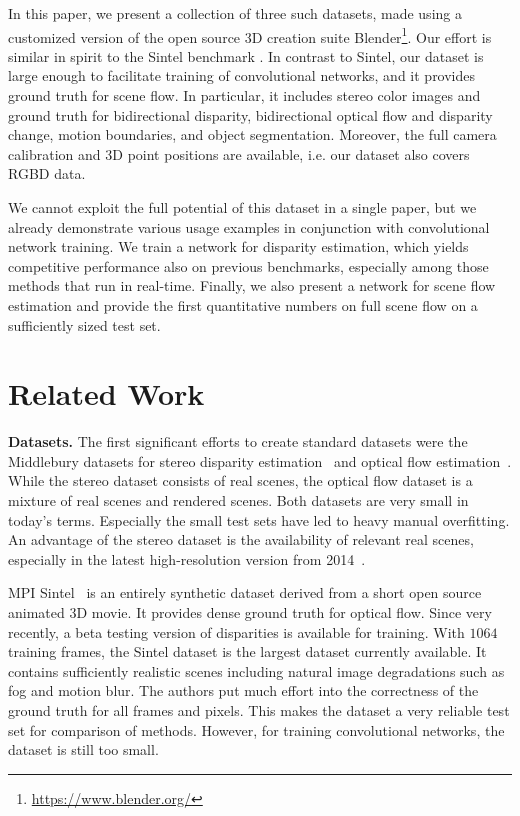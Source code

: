\documentclass[10pt,twocolumn,letterpaper]{article}
\begin{document}
\pagebreak

In this paper, we present a collection of three such datasets, made using a customized version of the open source 3D creation suite Blender\footnote{\url{https://www.blender.org/}}. Our effort is similar in spirit to the Sintel benchmark \cite{Butler-et-al-12}. In contrast to Sintel, our dataset is large enough to facilitate training of convolutional networks, and it provides ground truth for scene flow. 
In particular, it includes stereo color images and ground truth for bidirectional disparity, bidirectional optical flow and disparity change, motion boundaries, and object segmentation.
Moreover, the full camera calibration and 3D point positions are available, i.e. our dataset also covers RGBD data. 

We cannot exploit the full potential of this dataset in a single paper, but we already demonstrate various usage examples in conjunction with convolutional network training. 
We train a network for disparity estimation, which yields competitive performance also on previous benchmarks, especially among those methods that run in real-time. 
Finally, we also present a network for scene flow estimation and provide the first quantitative numbers on full scene flow on a sufficiently sized test set.

\section{Related Work}\label{sec:related}

\textbf{Datasets.}
The first significant efforts to create standard datasets were the Middlebury datasets for stereo disparity estimation~\cite{scharstein2002taxonomy} and optical flow estimation~\cite{Baker-et-al-09}. While the stereo dataset consists of real scenes, the optical flow dataset is a mixture of real scenes and rendered scenes. Both datasets are very small in today's terms. Especially the small test sets have led to heavy manual overfitting. An advantage of the stereo dataset is the availability of relevant real scenes, especially in the latest high-resolution version from 2014~\cite{scharstein2014high}.

MPI Sintel~\cite{Butler-et-al-12} is an entirely synthetic dataset derived from a short open source animated 3D movie. It provides dense ground truth for optical flow. Since very recently, a beta testing version of disparities is available for training. With $1064$ training frames, the Sintel dataset is the largest dataset currently available. It contains sufficiently realistic scenes including natural image degradations such as fog and motion blur. The authors put much effort into the correctness of the ground truth for all frames and pixels. This makes the dataset a very reliable test set for comparison of methods. However, for training convolutional networks, the dataset is still too small. 
\end{document}
